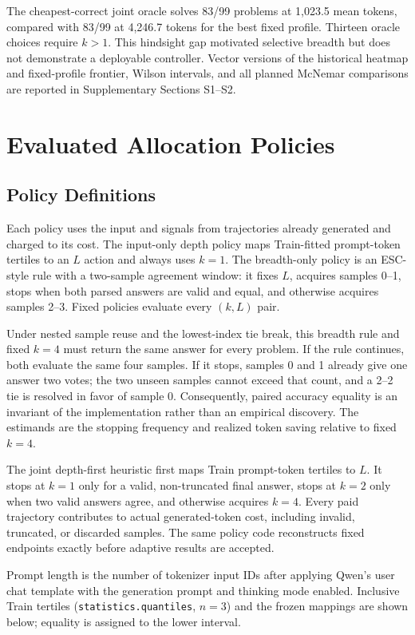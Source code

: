 \documentclass[runningheads]{llncs}
\begin{document}
The cheapest-correct joint oracle solves 83/99 problems at 1,023.5 mean
tokens, compared with 83/99 at 4,246.7 tokens for the best fixed profile.
Thirteen oracle choices require $k>1$. This hindsight gap motivated selective
breadth but does not demonstrate a deployable controller. Vector versions of
the historical heatmap and fixed-profile frontier, Wilson intervals, and all
planned McNemar comparisons are reported in Supplementary Sections S1--S2.

\section{Evaluated Allocation Policies}
\label{sec:policies}

\subsection{Policy Definitions}

Each policy uses the input and signals from trajectories already generated and
charged to its cost. The input-only depth policy maps Train-fitted prompt-token
tertiles to an $L$ action and always uses $k=1$. The breadth-only policy is an
ESC-style rule with a two-sample agreement window: it fixes $L$, acquires
samples 0--1, stops when both parsed answers are valid and equal, and otherwise
acquires samples 2--3. Fixed policies evaluate every $(k,L)$ pair.

Under nested sample reuse and the lowest-index tie break, this breadth rule and
fixed $k=4$ must return the same answer for every problem. If the rule
continues, both evaluate the same four samples. If it stops, samples 0 and 1
already give one answer two votes; the two unseen samples cannot exceed that
count, and a 2--2 tie is resolved in favor of sample 0. Consequently, paired
accuracy equality is an invariant of the implementation rather than an
empirical discovery. The estimands are the stopping frequency and realized
token saving relative to fixed $k=4$.

The joint depth-first heuristic first maps Train prompt-token tertiles to $L$.
It stops at $k=1$ only for a valid, non-truncated final answer, stops at $k=2$
only when two valid answers agree, and otherwise acquires $k=4$. Every paid
trajectory contributes to actual generated-token cost, including invalid,
truncated, or discarded samples. The same policy code reconstructs fixed
endpoints exactly before adaptive results are accepted.

Prompt length is the number of tokenizer input IDs after applying Qwen's user
chat template with the generation prompt and thinking mode enabled. Inclusive
Train tertiles (\texttt{statistics.quantiles}, $n=3$) and the frozen mappings
are shown below; equality is assigned to the lower interval.
\end{document}

